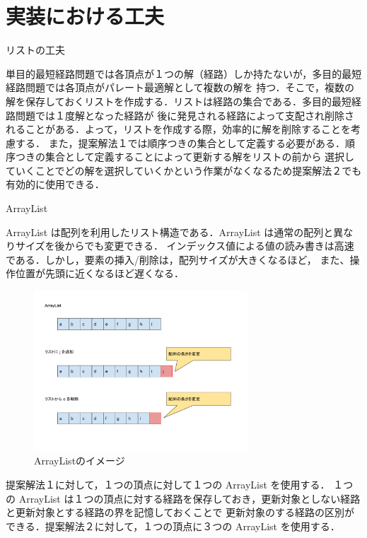 \documentclass[12pt]{optlab-bachelor}
\begin{document}
\section{実装における工夫}

\begin{description}
  \item[リストの工夫]
\end{description}

単目的最短経路問題では各頂点が１つの解（経路）しか持たないが，多目的最短経路問題では各頂点がパレート最適解として複数の解を
持つ．そこで，複数の解を保存しておくリストを作成する．リストは経路の集合である．多目的最短経路問題では１度解となった経路が
後に発見される経路によって支配され削除されることがある．よって，リストを作成する際，効率的に解を削除することを考慮する．
また，提案解法１では順序つきの集合として定義する必要がある．順序つきの集合として定義することによって更新する解をリストの前から
選択していくことでどの解を選択していくかという作業がなくなるため提案解法２でも有効的に使用できる．

\begin{description}
  \item[ArrayList]
\end{description}

ArrayList は配列を利用したリスト構造である．ArrayList は通常の配列と異なりサイズを後からでも変更できる．
インデックス値による値の読み書きは高速である．しかし，要素の挿入/削除は，配列サイズが大きくなるほど，
また、操作位置が先頭に近くなるほど遅くなる．

\begin{figure}[htbp]
  \centering
  \caption{ArrayListのイメージ}
  \includegraphics[height=6.0cm, width=8.0cm]{fig/fig9.pdf}
\end{figure}

提案解法１に対して，１つの頂点に対して１つの ArrayList を使用する．
１つの ArrayList は１つの頂点に対する経路を保存しておき，更新対象としない経路と更新対象とする経路の界を記憶しておくことで
更新対象のする経路の区別ができる．提案解法２に対して，１つの頂点に３つの ArrayList を使用する．
\end{document}
